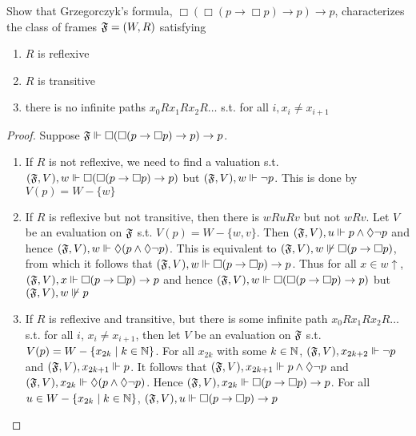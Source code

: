 \documentclass[11pt]{article}
\begin{document}
\begin{exercise}
Show that Grzegorczyk's formula, \(\Box(\Box(p\to\Box p)\to p)\to p\),
characterizes the class of frames \(\mathfrak{F}=(W,R)\) satisfying
\begin{enumerate}
\item \(R\) is reflexive
\item \(R\) is transitive
\item there is no infinite paths \(x_0Rx_1Rx_2R\dots\) s.t. for all \(i,x_i\neq x_{i+1}\)
\end{enumerate}
\end{exercise}

\begin{proof}
Suppose \(\mathfrak{F}\Vdash\Box(\Box(p\to\Box p)\to p)\to p\).
\begin{enumerate}
\item If \(R\) is not reflexive, we need to find a valuation s.t.
\((\mathfrak{F},V),w\Vdash\Box(\Box(p\to\Box p)\to p)\) but 
\((\mathfrak{F},V),w\Vdash \neg p\). This is done by \(V(p)=W-\{w\}\)
\item If \(R\) is reflexive but not transitive, then there is \(wRuRv\) but not
\(wRv\).
Let \(V\) be an evaluation on \(\mathfrak{F}\) s.t. \(V(p)=W-\{w,v\}\). Then
\((\mathfrak{F},V),u\Vdash p\wedge\Diamond\neg p\) and hence
\((\mathfrak{F},V),w\Vdash\Diamond(p\wedge\Diamond\neg p)\). This is equivalent to
\((\mathfrak{F},V),w\not\Vdash\Box(p\to\Box p)\), from which it follows that
\((\mathfrak{F},V),w\Vdash\Box(p\to\Box p)\to p\). Thus for all \(x\in w\uparrow\),
\((\mathfrak{F},V),x\Vdash\Box(p\to\Box p)\to p\) and hence
\((\mathfrak{F},V),w\Vdash\Box(\Box(p\to\Box p)\to p)\) but \((\mathfrak{F},V),w\not\Vdash p\)
\item If \(R\) is reflexive and transitive, but there is some infinite path
\(x_0Rx_1Rx_2R\dots\) s.t. for all \(i\), \(x_i\neq x_{i+1}\), then let
\(V\) be an evaluation on \(\mathfrak{F}\) s.t. \(V(p)=W-\{x_{2k}\mid k\in\mathbb{N}\}\).
For all \(x_{2k}\) with some \(k\in\mathbb{N}\), \((\mathfrak{F},V),x_{2k+2}\Vdash\neg p\)
and \((\mathfrak{F},V),x_{2k+1}\Vdash p\). It follows that \((\mathfrak{F},V),x_{2k+1}\Vdash
      p\wedge\Diamond\neg p\) and
\((\mathfrak{F},V),x_{2k}\Vdash\Diamond(p\wedge\Diamond\neg p)\). Hence
\((\mathfrak{F},V),x_{2k}\Vdash\Box(p\to\Box p)\to p\). For all \(u\in
      W-\{x_{2k}\mid k\in\mathbb{N}\}\), \((\mathfrak{F},V),u\Vdash\Box(p\to\Box p)\to p\)
\end{enumerate}



\end{proof}
\end{document}
